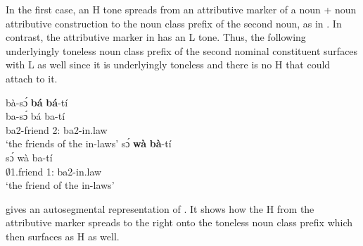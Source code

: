 In the first case, an H tone spreads from an attributive marker of a noun + noun attributive construction to the noun class prefix of the second noun, as in . In contrast, the attributive marker in  has an L tone. Thus, the following underlyingly toneless noun class prefix of  the second nominal constituent surfaces with L as well since it is underlyingly toneless and there is no H that could attach to it.


\ea\label{CONr}
  \ea \label{CONr2}
  \glll     bà-sɔ́ {\bfseries bá} {\bfseries bá}-tí  \\
		ba-sɔ́ bá ba-tí \\ 
              ba2-friend 2:{\ATT} ba2-in.law   \\
    \trans `the friends of the in-laws'
\ex\label{CONr1} 
  \glll     sɔ́ {\bfseries wà} {\bfseries bà}-tí \\
	sɔ́ wà ba-tí \\	
              $\emptyset$1.friend 1:{\ATT} ba2-in.law   \\
    \trans `the friend of the in-laws'
\z
\z

 gives an autosegmental representation of . It shows how the H from the attributive marker spreads to the right onto the toneless noun class prefix which then surfaces as H as well.





